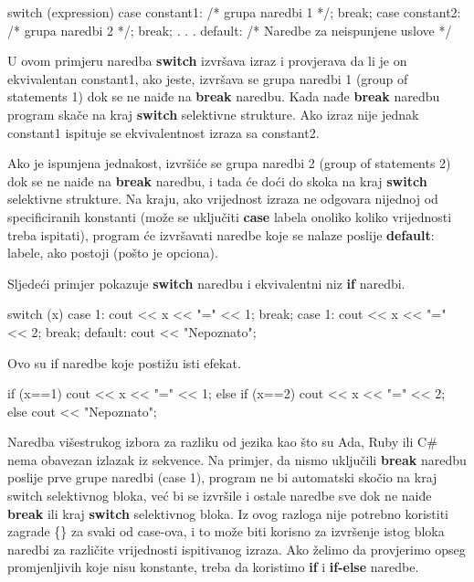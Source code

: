 \documentclass[11pt]{book}
\begin{document}
\begin{shortlisting}
  switch (expression)
    {
      case constant1: /* grupa naredbi 1 */;
      break;
      case constant2: /* grupa naredbi 2 */;
      break;
      . . .
      default:        /* Naredbe za neispunjene uslove */
    }
\end{shortlisting}

U ovom primjeru naredba \textbf{switch} izvršava izraz i provjerava da li je on ekvivalentan constant1, ako jeste, izvršava se grupa naredbi 1 (group of statements 1) dok se ne naiđe na \textbf{break} naredbu. Kada nađe \textbf{break} naredbu program skače na kraj \textbf{switch} selektivne strukture. Ako izraz nije jednak constant1 ispituje se ekvivalentnost izraza sa constant2.

Ako je ispunjena jednakost, izvršiće se grupa naredbi 2 (group of statements 2) dok se ne naiđe na \textbf{break} naredbu, i tada će doći do skoka na kraj \textbf{switch} selektivne strukture. Na kraju, ako vrijednost izraza ne odgovara nijednoj od specificiranih konstanti (može se uključiti \textbf{case} labela onoliko koliko vrijednosti treba ispitati), program će izvršavati naredbe koje se nalaze poslije \textbf{default}: labele, ako postoji (pošto je opciona).

Sljedeći primjer pokazuje \textbf{switch} naredbu i ekvivalentni niz \textbf{if} naredbi.

\begin{shortlisting}
  switch (x) {
      case 1:
      cout << x << "=" << 1;
      break;
      case 1:
      cout << x << "=" << 2;
      break;
      default:
      cout << "Nepoznato";
    }
\end{shortlisting}

Ovo su if naredbe koje postižu isti efekat.

\begin{shortlisting}
  if (x==1) {
      cout << x << "=" << 1;
    }
  else
  if (x==2) {
      cout << x << "=" << 2;
    }
  else
  cout << "Nepoznato";
\end{shortlisting}

Naredba višestrukog izbora za razliku od jezika kao što su Ada, Ruby ili C\# nema obavezan izlazak iz sekvence. Na primjer, da nismo uključili \textbf{break} naredbu poslije prve grupe naredbi (case 1), program ne bi automatski skočio na kraj switch selektivnog bloka, već bi se izvršile i ostale naredbe sve dok ne naiđe \textbf{break} ili kraj \textbf{switch} selektivnog bloka. Iz ovog razloga nije potrebno koristiti zagrade \{\} za svaki od case-ova, i to može biti korisno za izvršenje istog bloka naredbi za različite vrijednosti ispitivanog izraza. Ako želimo da provjerimo opseg promjenljivih koje nisu konstante, treba da koristimo \textbf{if} i \textbf{if-else} naredbe.
\end{document}
